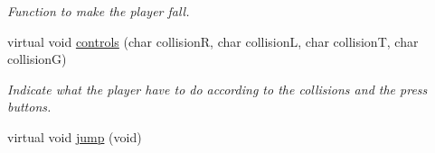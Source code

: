 \begin{DoxyCompactItemize}
\begin{DoxyCompactList}\small\item\em Function to make the player fall. \end{DoxyCompactList}\item 
virtual void \hyperlink{class_player_a2dea085dd04cc2d2c0a73950b8f6383b}{controls} (char collision\-R, char collision\-L, char collision\-T, char collision\-G)
\begin{DoxyCompactList}\small\item\em Indicate what the player have to do according to the collisions and the press buttons. \end{DoxyCompactList}\item 
\hypertarget{class_player_a0ccf6995405ca7f8efd159117eb332c6}{virtual void \hyperlink{class_player_a0ccf6995405ca7f8efd159117eb332c6}{jump} (void)}\label{class_player_a0ccf6995405ca7f8efd159117eb332c6}


\end{DoxyCompactItemize}
